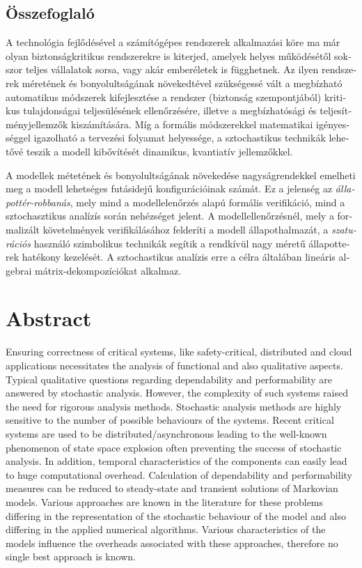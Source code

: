 \begin{otherlanguage}{magyar}

  \chapter{Összefoglaló}

  A technológia fejlődésével a számítógépes rendszerek alkalmazási
  köre ma már olyan biztonságkritikus rendszerekre is kiterjed,
  amelyek helyes működésétől sokszor teljes vállalatok sorsa, vagy
  akár emberéletek is függhetnek. Az ilyen rendszerek méretének és
  bonyolultságának növekedtével szükségessé vált a megbízható
  automatikus módszerek kifejlesztése a rendszer (biztonság
  szempontjából) kritikus tulajdonságai teljesülésének ellenőrzésére,
  illetve a megbízhatósági és teljesítményjellemzők kiszámítására. Míg
  a formális módszerekkel matematikai igényességgel igazolható a
  tervezési folyamat helyessége, a sztochastikus technikák lehetővé
  teszik a modell kibővítését dinamikus, kvantiatív jellemzőkkel.

  A modellek métetének és bonyolultságának növekedése nagyságrendekkel
  emelheti meg a modell lehetséges futásidejű konfigurációinak
  számát. Ez a jelenség az \emph{állapottér-robbanás}, mely mind a
  modellelenőrzés alapú formális verifikáció, mind a sztochasztikus
  analízís során nehézséget jelent. A modellellenőrzésnél, mely a
  formalizált követelmények verifikálásához felderíti a modell
  állapothalmazát, a \emph{szaturációs} használó szimbolikus technikák
  segítik a rendkívül nagy méretű állapotterek hatékony kezelését. A
  sztochastikus analízis erre a célra általában lineáris algebrai
  mátrix-dekompozíciókat alkalmaz.

\end{otherlanguage}

\chapter{Abstract}

Ensuring correctness of critical systems, like safety-critical, distributed and cloud applications necessitates the analysis of functional and also qualitative aspects. Typical qualitative questions regarding dependability and performability are answered by stochastic analysis. However, the complexity of such systems raised the need for rigorous analysis methods. 
Stochastic analysis methods are highly sensitive to the number of possible behaviours of the systems. Recent critical systems are used to be distributed/asynchronous leading to the well-known phenomenon of state space explosion often preventing the success of stochastic analysis. In addition, temporal characteristics of the components can easily lead to huge 
computational overhead. 
Calculation of dependability and performability measures can be reduced to steady-state and transient solutions of Markovian models. Various approaches are known in the literature for these problems differing in the representation of the stochastic behaviour of the model and also differing in the applied numerical algorithms. Various characteristics of the models influence the overheads associated with these approaches, therefore no single best approach is known.
 
